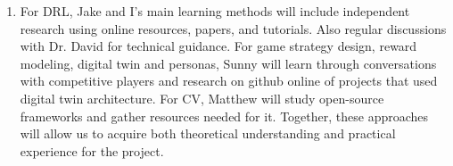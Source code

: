 \documentclass{article}
\begin{document}
\begin{enumerate}
    \item For DRL, Jake and I's main learning methods will include independent
     research using online resources, papers, and tutorials. Also regular discussions
      with Dr. David for technical guidance. For game strategy design, reward modeling, digital twin
      and personas, Sunny will learn
        through conversations with competitive players and research on github online of projects
        that used digital twin architecture.
        For CV, Matthew will study open-source frameworks and gather resources needed for it. Together, these approaches will allow us to 
         acquire both theoretical understanding and practical experience for the project.
\end{enumerate}
\end{document}
